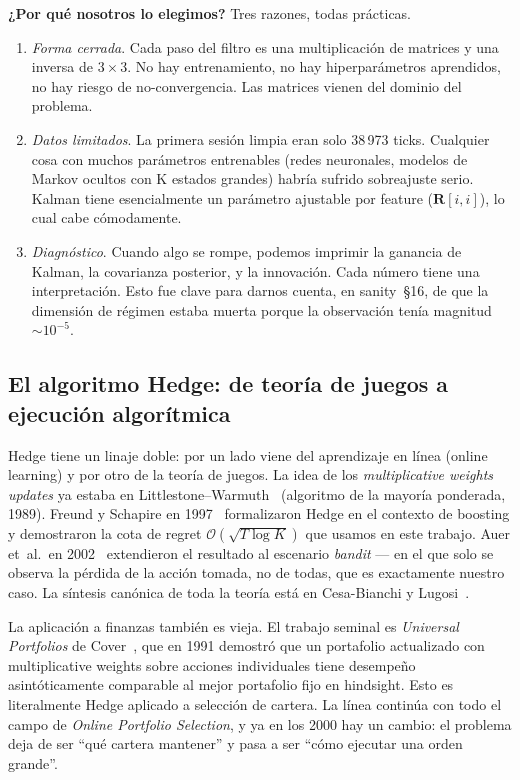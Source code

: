 \documentclass[journal,onecolumn,11pt]{IEEEtran}
\newcommand{\Rm}{\mathbf{R}}
\begin{document}
\medskip

\noindent
\textbf{¿Por qué nosotros lo elegimos?} Tres razones, todas
prácticas.
\begin{enumerate}
\item \emph{Forma cerrada}. Cada paso del filtro es una multiplicación
      de matrices y una inversa de $3\!\times\!3$. No hay
      entrenamiento, no hay hiperparámetros aprendidos, no hay riesgo
      de no-convergencia. Las matrices vienen del dominio del problema.
\item \emph{Datos limitados}. La primera sesión limpia eran solo 38\,973
      ticks. Cualquier cosa con muchos parámetros entrenables
      (redes neuronales, modelos de Markov ocultos con K estados
      grandes) habría sufrido sobreajuste serio. Kalman tiene
      esencialmente un parámetro ajustable por feature ($\Rm[i,i]$),
      lo cual cabe cómodamente.
\item \emph{Diagnóstico}. Cuando algo se rompe, podemos imprimir la
      ganancia de Kalman, la covarianza posterior, y la innovación.
      Cada número tiene una interpretación. Esto fue clave para
      darnos cuenta, en sanity~§16, de que la dimensión de régimen
      estaba muerta porque la observación tenía magnitud $\sim\!10^{-5}$.
\end{enumerate}

\subsection{El algoritmo Hedge: de teoría de juegos a ejecución
            algorítmica}

Hedge tiene un linaje doble: por un lado viene del aprendizaje en
línea (online learning) y por otro de la teoría de juegos.
La idea de los \emph{multiplicative weights updates} ya estaba en
Littlestone--Warmuth~\cite{littlestone1994} (algoritmo de la
mayoría ponderada, 1989). Freund y Schapire en
1997~\cite{freund1997} formalizaron Hedge en el contexto de
boosting y demostraron la cota de regret
$\mathcal{O}(\sqrt{T\log K})$ que usamos en este trabajo. Auer
et~al.\ en 2002~\cite{auer2002} extendieron el resultado al
escenario \emph{bandit} --- en el que solo se observa la pérdida
de la acción tomada, no de todas, que es exactamente nuestro caso.
La síntesis canónica de toda la teoría está en
Cesa-Bianchi y Lugosi~\cite{cesabianchi2006}.

\medskip

\noindent
La aplicación a finanzas también es vieja. El trabajo seminal es
\emph{Universal Portfolios} de Cover~\cite{cover1991}, que en 1991
demostró que un portafolio actualizado con multiplicative weights
sobre acciones individuales tiene desempeño asintóticamente
comparable al mejor portafolio fijo en hindsight. Esto es
literalmente Hedge aplicado a selección de cartera. La línea
continúa con todo el campo de \emph{Online Portfolio Selection},
y ya en los 2000 hay un cambio: el problema deja de ser ``qué
cartera mantener'' y pasa a ser ``cómo ejecutar una orden grande''.
\end{document}
